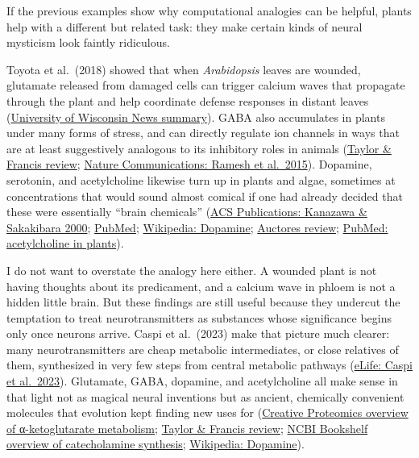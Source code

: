 If the previous examples show why computational analogies can be helpful, plants help with a different but related task: they make certain kinds of neural mysticism look faintly ridiculous.

Toyota et al.~(2018) showed that when \emph{Arabidopsis} leaves are wounded, glutamate released from damaged cells can trigger calcium waves that propagate through the plant and help coordinate defense responses in distant leaves (\href{https://news.wisc.edu/blazes-of-light-reveal-how-plants-signal-danger-long-distances/}{University of Wisconsin News summary}). GABA also accumulates in plants under many forms of stress, and can directly regulate ion channels in ways that are at least suggestively analogous to its inhibitory roles in animals (\href{https://www.tandfonline.com/doi/full/10.1080/15592324.2020.1862565}{Taylor \& Francis review}; \href{https://www.nature.com/articles/ncomms8879}{Nature Communications: Ramesh et al.~2015}). Dopamine, serotonin, and acetylcholine likewise turn up in plants and algae, sometimes at concentrations that would sound almost comical if one had already decided that these were essentially ``brain chemicals'' (\href{https://pubs.acs.org/doi/10.1021/jf9909860}{ACS Publications: Kanazawa \& Sakakibara 2000}; \href{https://pubmed.ncbi.nlm.nih.gov/10725161/}{PubMed}; \href{https://en.wikipedia.org/wiki/Dopamine}{Wikipedia: Dopamine}; \href{https://auctoresonline.org/article/a-review-on-neurotransmitters-dopamine--serotonin}{Auctores review}; \href{https://pubmed.ncbi.nlm.nih.gov/11243568/}{PubMed: acetylcholine in plants}).

I do not want to overstate the analogy here either. A wounded plant is not having thoughts about its predicament, and a calcium wave in phloem is not a hidden little brain. But these findings are still useful because they undercut the temptation to treat neurotransmitters as substances whose significance begins only once neurons arrive. Caspi et al.~(2023) make that picture much clearer: many neurotransmitters are cheap metabolic intermediates, or close relatives of them, synthesized in very few steps from central metabolic pathways (\href{https://elifesciences.org/articles/83361}{eLife: Caspi et al.~2023}). Glutamate, GABA, dopamine, and acetylcholine all make sense in that light not as magical neural inventions but as ancient, chemically convenient molecules that evolution kept finding new uses for (\href{https://www.creative-proteomics.com/resource/amino-acid-degradation-alpha-ketoglutarate.htm}{Creative Proteomics overview of α-ketoglutarate metabolism}; \href{https://www.tandfonline.com/doi/full/10.1080/15592324.2020.1862565}{Taylor \& Francis review}; \href{https://www.ncbi.nlm.nih.gov/books/NBK20199/}{NCBI Bookshelf overview of catecholamine synthesis}; \href{https://en.wikipedia.org/wiki/Dopamine}{Wikipedia: Dopamine}).

